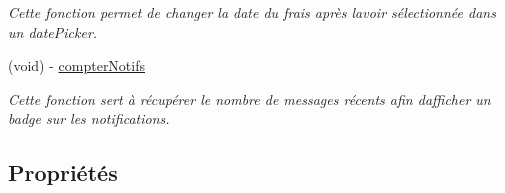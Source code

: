 \begin{DoxyCompactItemize}
\begin{DoxyCompactList}\small\item\em Cette fonction permet de changer la date du frais après l\textquotesingle{}avoir sélectionnée dans un date\+Picker. \end{DoxyCompactList}\item 
(void) -\/ \hyperlink{interface_frais_table_view_controller_a4678c45c6f34c58900f35ccb2f60f6e5}{compter\+Notifs}
\begin{DoxyCompactList}\small\item\em Cette fonction sert à récupérer le nombre de messages récents afin d\textquotesingle{}afficher un badge sur les notifications. \end{DoxyCompactList}\end{DoxyCompactItemize}
\subsection*{Propriétés}
